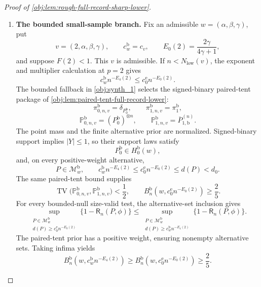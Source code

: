 \documentclass[11pt]{article}
\begin{document}
\begin{proof}[Proof of \cref{obj:lem:rough-full-record-sharp-lower}]
\begin{enumerate}
\item \textbf{The bounded small-sample branch.}
Fix an admissible \(w=(\alpha,\beta,\gamma)\), put
\[
v=(2,\alpha,\beta,\gamma),
\qquad
c_w^{\mathrm b}=c_v,
\qquad
E_0(2)=\frac{2\gamma}{4\gamma+1},
\]
and suppose \(F(2)<1\). This \(v\) is admissible. If \(n<N_{\mathrm{low}}(v)\), the exponent and multiplier calculation at \(p=2\) gives
\[
c_w^{\mathrm b}n^{-E_4(2)}
\le c_0^{\mathrm e}n^{-E_0(2)}.
\]
The bounded fallback in \cref{obj:synth_1} selects the signed-binary paired-tent package of
\cref{obj:lem:paired-tent-full-record-lower}:
\[
\pi^{\mathrm b}_{0,n,v}=\delta_{P_0^{\mathrm b}},
\qquad
\pi^{\mathrm b}_{1,n,v}=\pi_1^{\mathrm b},
\]
\[
\mathbb P^{\mathrm b}_{0,n,v}
=(P_0^{\mathrm b})^{\otimes n},
\qquad
\mathbb P^{\mathrm b}_{1,n,v}
=\overline P_{1,\mathrm b}^{(n)}.
\]
The point mass and the finite alternative prior are normalized. Signed-binary support implies \(|Y|\le1\), so their support laws satisfy
\[
P_0^{\mathrm b}\in H_0^{\mathrm b}(w),
\]
and, on every positive-weight alternative,
\[
P\in\mathcal M_w^{\mathrm b},
\qquad
c_w^{\mathrm b}n^{-E_4(2)}
\le c_0^{\mathrm e}n^{-E_0(2)}
\le d(P)<d_0.
\]
The same paired-tent bound supplies
\[
\operatorname{TV}
\bigl(\mathbb P^{\mathrm b}_{0,n,v},
      \mathbb P^{\mathrm b}_{1,n,v}\bigr)<\frac12,
\qquad
B_n^{\mathrm b}\!\left(w,c_0^{\mathrm e}n^{-E_0(2)}\right)
\ge\frac25.
\]
For every bounded-null size-valid test, the alternative-set inclusion gives
\[
\sup_{\substack{P\in\mathcal M_w^{\mathrm b}\\
d(P)\ge c_0^{\mathrm e}n^{-E_0(2)}}}
\{1-\mathsf R_n(P,\phi)\}
\le
\sup_{\substack{P\in\mathcal M_w^{\mathrm b}\\
d(P)\ge c_w^{\mathrm b}n^{-E_4(2)}}}
\{1-\mathsf R_n(P,\phi)\}.
\]
The paired-tent prior has a positive weight, ensuring nonempty alternative sets. Taking infima yields
\[
B_n^{\mathrm b}\!\left(w,c_w^{\mathrm b}n^{-E_4(2)}\right)
\ge
B_n^{\mathrm b}\!\left(w,c_0^{\mathrm e}n^{-E_0(2)}\right)
\ge\frac25.
\]


\end{enumerate}
\end{proof}
\end{document}
